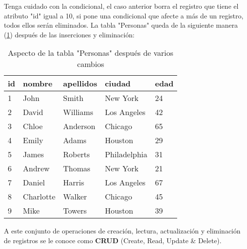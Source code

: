 Tenga cuidado con la condicional, el caso anterior borra el registro que tiene el atributo "id" igual a 10, si pone una condicional que afecte a más de un registro, todos ellos serán eliminados. La tabla "Personas" queda de la siguiente manera (\ref{tab: 25}) después de las inserciones y eliminación:
\begin{table}[H]
    \centering
    \caption{Aspecto de la tabla "Personas" después de varios cambios}
    \label{tab: 25}
    \begin{tabular}{|l|l|l|l|l|}
        \hline
        \textbf{id} & \textbf{nombre} & \textbf{apellidos} & \textbf{ciudad} & \textbf{edad} \\
        \hline
        1 & John        & Smith     & New York      & 24 \\
        \hline
        2 & David       & Williams  & Los Angeles   & 42 \\
        \hline
        3 & Chloe       & Anderson  & Chicago       & 65 \\
        \hline
        4 & Emily       & Adams     & Houston       & 29 \\
        \hline
        5 & James       & Roberts   & Philadelphia  & 31 \\
        \hline
        6 & Andrew      & Thomas    & New York      & 21 \\
        \hline
        7 & Daniel      & Harris    & Los Angeles   & 67 \\
        \hline
        8 & Charlotte   & Walker    & Chicago       & 45 \\
        \hline
        9 & Mike        & Towers    & Houston       & 39 \\
        \hline
    \end{tabular}
\end{table}

A este conjunto de operaciones de creación, lectura, actualización y eliminación de registros se le conoce como \textbf{CRUD} (Create, Read, Update \& Delete).
